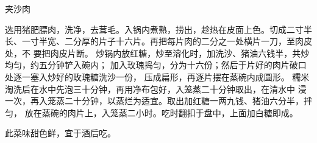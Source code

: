 \begin{recipe}{夹沙肉}

\ingredients


\cooking

\step 选用猪肥膘肉，洗净，去茸毛。入锅内煮熟，捞出，趁热在皮面上色。切成二寸半
长、一寸半宽、二分厚的片子十六片。再把每片肉的二分之一处横片一刀，至肉皮处，不
要把肉皮片断。
\step 炒锅内放红糖，炒至溶化时，加洗沙、猪油六钱半，共炒均匀，约五分钟铲入碗内；
加入玫瑰捣匀，分为十六份；然后于片好的肉片破口处逐一塞入炒好的玫瑰糖洗沙一份，
压成扁形，再逐片摆在蒸碗内成圆形。
\step 糯米淘洗后在水中先泡三十分钟，再用净布包好，入笼蒸二十分钟取出，在清水中
浸一次，再入笼蒸二十分钟，以蒸烂为适宜。取出加红糖一两九钱、猪油六分半，拌匀，
放在蒸碗的肉片上，入笼蒸二小时。吃时翻扣于盘中，上面加白糖即成。

\notes

此菜味甜色鲜，宜于酒后吃。

\end{recipe}

